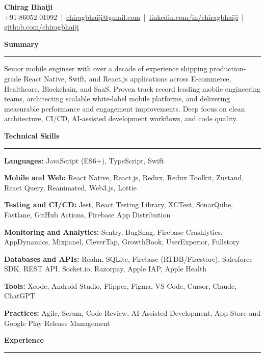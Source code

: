 \documentclass[10pt, letterpaper]{article}
\newcommand{\ressection}[1]{%
  \vspace{16pt}%
  {\large\textbf{#1}}%
  \vspace{0pt}\newline%
  \rule{\linewidth}{0.4pt}%
  \vspace{0pt}%
}
\newcommand{\skillrow}[2]{%
  {\small\textbf{#1:} #2}\par\vspace{1pt}%
}
\begin{document}
\begin{center}
  {\LARGE\textbf{Chirag Bhaiji}}\\[4pt]
  {\small
  +91-86052 01092 \,|\,
  \href{mailto:chiragbhaiji@gmail.com}{chiragbhaiji@gmail.com} \,|\,
  \href{https://linkedin.com/in/chiragbhaiji}{linkedin.com/in/chiragbhaiji} \,|\,
  \href{https://github.com/chiragbhaiji}{github.com/chiragbhaiji}%
  }
\end{center}

\ressection{Summary}
{\small Senior mobile engineer with over a decade of experience shipping production-grade React Native,
Swift, and React.js applications across E-commerce, Healthcare, Blockchain, and SaaS. Proven track record
leading mobile engineering teams, architecting scalable white-label mobile platforms, and delivering
measurable performance and engagement improvements. Deep focus on clean architecture, CI/CD,
AI-assisted development workflows, and code quality.}

\ressection{Technical Skills}
\skillrow{Languages}{JavaScript (ES6+), TypeScript, Swift}
\skillrow{Mobile and Web}{React Native, React.js, Redux, Redux Toolkit, Zustand, React Query, Reanimated, Web3.js, Lottie}
\skillrow{Testing and CI/CD}{Jest, React Testing Library, XCTest, SonarQube, Fastlane, GitHub Actions, Firebase App Distribution}
\skillrow{Monitoring and Analytics}{Sentry, BugSnag, Firebase Crashlytics, AppDynamics, Mixpanel, CleverTap, GrowthBook, UserExperior, Fullstory}
\skillrow{Databases and APIs}{Realm, SQLite, Firebase (RTDB/Firestore), Salesforce SDK, REST API, Socket.io, Razorpay, Apple IAP, Apple Health}
\skillrow{Tools}{Xcode, Android Studio, Flipper, Figma, VS Code, Cursor, Claude, ChatGPT}
\skillrow{Practices}{Agile, Scrum, Code Review, AI-Assisted Development, App Store and Google Play Release Management}

\ressection{Experience}
\end{document}
